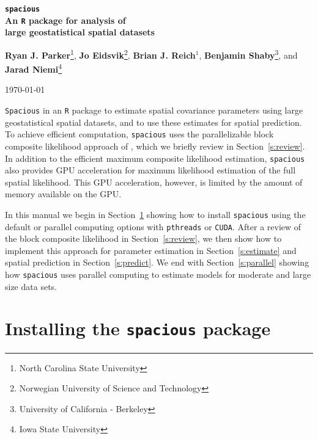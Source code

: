 \documentclass[11pt]{article}
\begin{document}
\linenumbers

\pagestyle{empty}
\begin{center}
{\Large
	{\bf
		{\tt spacious} \\
		\vspace{3pt}
		An {\tt R} package for analysis of \\
		\vspace{4pt}
		large geostatistical spatial datasets
	}
}

\vspace{24pt}
\textbf{Ryan J. Parker}\footnote{North Carolina State University},
\textbf{Jo Eidsvik}\footnote{Norwegian University of Science and Technology},
\textbf{Brian J. Reich$^1$},
\textbf{Benjamin Shaby}\footnote{University of California - Berkeley}, and
\textbf{Jarad Niemi}\footnote{Iowa State University}
\vspace{24pt}

\today
\end{center}

{\tt Spacious} in an {\tt R} package to estimate spatial covariance parameters using large geostatistical spatial datasets, and to use these estimates for spatial prediction.
To achieve efficient computation, {\tt spacious} uses the parallelizable block composite likelihood approach of \cite{Eidsvik:2013}, which we briefly review in Section~\ref{s:review}.
In addition to the efficient maximum composite likelihood estimation, {\tt spacious} also provides GPU acceleration for maximum likelihood estimation of the full spatial likelihood.
This GPU acceleration, however, is limited by the amount of memory available on the GPU.

In this manual we begin in Section~\ref{s:install} showing how to install {\tt spacious} using the default or parallel computing options with {\tt pthreads} or {\tt CUDA}.
After a review of the block composite likelihood in Section~\ref{s:review}, we then show how to implement this approach for parameter estimation in Section~\ref{s:estimate} and spatial prediction in Section~\ref{s:predict}.
We end with Section~\ref{s:parallel} showing how {\tt spacious} uses parallel computing to estimate models for moderate and large size data sets.

\section{Installing the {\tt spacious} package}\label{s:install}
\end{document}
